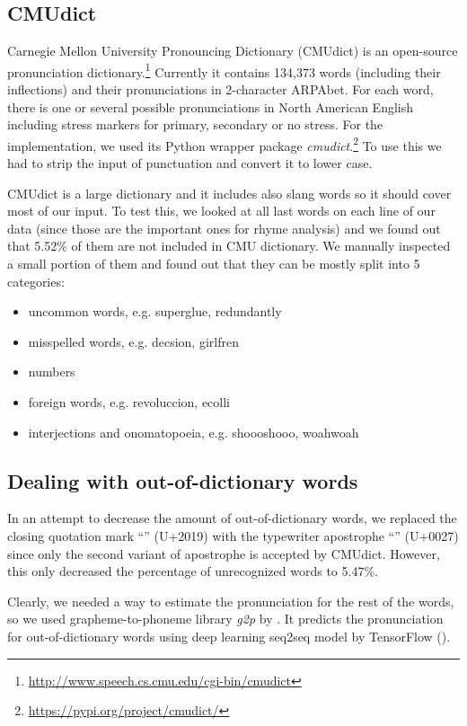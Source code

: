\subsection{CMUdict}\label{cmudict}
Carnegie Mellon University Pronouncing Dictionary (CMUdict) is an open-source pronunciation dictionary.\footnote{\url{http://www.speech.cs.cmu.edu/cgi-bin/cmudict}} Currently it contains 134,373 words (including their inflections) and their pronunciations in 2-character ARPAbet. 
For each word, there is one or several possible pronunciations in North American English including stress markers for primary, secondary or no stress. For the implementation, we used its Python wrapper package \textit{cmudict}.\footnote{\url{https://pypi.org/project/cmudict/}} To use this we had to strip the input of punctuation and convert it to lower case.

CMUdict is a large dictionary and it includes also slang words so it should cover most of our input. To test this, we looked at all last words on each line of our data (since those are the important ones for rhyme analysis) and we found out that 5.52\% of them are not included in CMU dictionary. We manually inspected a small portion of them and found out that they can be mostly split into  5 categories:

\begin{itemize}
	\item uncommon words, e.g. superglue, redundantly
	\item misspelled words, e.g. decsion, girlfren
	\item numbers
	\item foreign words, e.g. revoluccion, ecolli
	\item interjections and onomatopoeia, e.g. shoooshooo, woahwoah
\end{itemize}

\subsection{Dealing with out-of-dictionary words}
In an attempt to decrease the amount of out-of-dictionary words, we replaced the closing  quotation mark ``'' (U+2019) with the typewriter apostrophe ``\texttt{\selectfont{}}''
 (U+0027) since only the second variant of apostrophe is accepted by CMUdict. However, this only decreased the percentage of unrecognized words to 5.47\%.

Clearly, we needed a way to estimate the pronunciation for the rest of the words, so we used grapheme-to-phoneme library \textit{g2p} by \cite{g2pE2019}. It predicts the pronunciation for out-of-dictionary words using deep learning seq2seq model by TensorFlow (\cite{tensorflow2015-whitepaper}).

